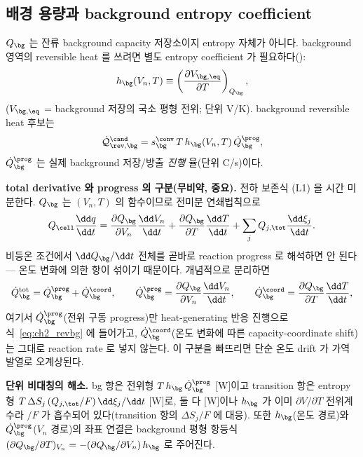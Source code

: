 \subsection{배경 용량과 background entropy coefficient}\label{sec:ch2_bg}
$Q_\bg$ 는 잔류 background capacity 저장소이지 entropy 자체가 아니다. background 영역의 reversible heat 를
쓰려면 별도 entropy coefficient 가 필요하다():
\begin{equation}
h_\bg(V_n,T)\equiv\left(\frac{\partial V_{\bg,\eq}}{\partial T}\right)_{Q_\bg},
\label{eq:ch2_hbg}
\end{equation}
($V_{\bg,\eq}$ = background 저장의 국소 평형 전위; 단위 V/K). background reversible heat 후보는
\begin{equation}
\dot{\mathcal Q}_{\rev,\bg}^{\cand}=s_\bg^{\conv}\,T\,h_\bg(V_n,T)\,\dot Q_\bg^{\prog},
\label{eq:ch2_revbg}
\end{equation}
$\dot Q_\bg^{\prog}$ 는 실제 background 저장/방출 \emph{진행} 율(단위 C/s)이다.

\textbf{total derivative 와 progress 의 구분(무비약, 중요).} 전하 보존식 (L1) 을 시간 미분한다. $Q_\bg$ 는
$(V_n,T)$ 의 함수이므로 전미분 연쇄법칙으로
\begin{equation}
Q_\cell\frac{\dd q}{\dd t}=\frac{\partial Q_\bg}{\partial V_n}\frac{\dd V_n}{\dd t}+\frac{\partial Q_\bg}{\partial T}\frac{\dd T}{\dd t}
+\sum_jQ_{j,\tot}\frac{\dd\xi_j}{\dd t}.
\label{eq:ch2_dQdt}
\end{equation}
비등온 조건에서 $\dd Q_\bg/\dd t$ 전체를 곧바로 reaction progress 로 해석하면 안 된다 — 온도 변화에 의한 항이
섞이기 때문이다. 개념적으로 분리하면
\begin{equation}
\dot Q_\bg^{\mathrm{tot}}=\dot Q_\bg^{\prog}+\dot Q_\bg^{\coord},\qquad
\dot Q_\bg^{\prog}=\frac{\partial Q_\bg}{\partial V_n}\frac{\dd V_n}{\dd t},\qquad
\dot Q_\bg^{\coord}=\frac{\partial Q_\bg}{\partial T}\frac{\dd T}{\dd t},
\label{eq:ch2_bgsplit}
\end{equation}
여기서 $\dot Q_\bg^{\prog}$(전위 구동 progress)만 heat-generating 반응 진행으로 식~\eqref{eq:ch2_revbg} 에
들어가고, $\dot Q_\bg^{\coord}$(온도 변화에 따른 capacity-coordinate shift)는 그대로 reaction rate 로 넣지
않는다. 이 구분을 빠뜨리면 단순 온도 drift 가 가역 발열로 오계상된다.

\textbf{단위 비대칭의 해소.} bg 항은 전위형 $T\,h_\bg\,\dot Q_\bg^{\prog}$ [W]이고 transition 항은 entropy형
$T\,\Delta S_j\,(Q_{j,\tot}/F)\,\dd\xi_j/\dd t$ [W]로, 둘 다 [W]이나 $h_\bg$ 가 이미 $\partial V/\partial T$
전위계수라 $/F$ 가 흡수되어 있다(transition 항의 $\Delta S_j/F$ 에 대응). 또한 $h_\bg$(온도 경로)와
$\dot Q_\bg^{\prog}$($V_n$ 경로)의 좌표 연결은 background 평형 항등식
$(\partial Q_\bg/\partial T)_{V_n}=-(\partial Q_\bg/\partial V_n)\,h_\bg$ 로 주어진다.

